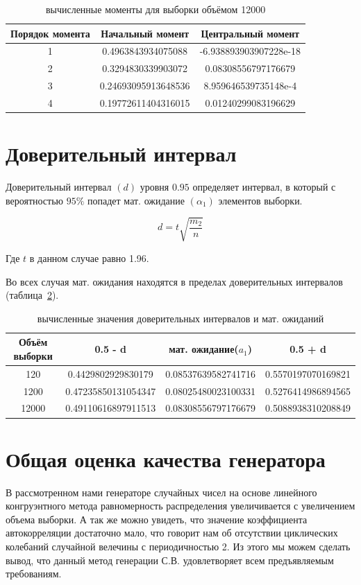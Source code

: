 \documentclass[a4paper,12pt]{article}
\begin{document}
\begin{table}[h]
	\caption{вычисленные моменты для выборки объёмом 12000}
	\begin{tabular}{|c|c|c|}
	\hline 
	Порядок момента & Начальный момент & Центральный момент \\ 
	\hline 
	1 & 0.4963843934075088 & -6.938893903907228e-18 \\ 
	\hline 
	2 & 0.3294830339903072 & 0.08308556797176679 \\ 
	\hline 
	3 & 0.24693095913648536 & 8.959646539735148e-4 \\ 
	\hline 
	4 & 0.19772611404316015 & 0.01240299083196629 \\ 
	\hline 
	\end{tabular} 
	
	\label{table:a_u_3}
\end{table}

\newpage\section{Доверительный интервал}
Доверительный интервал $(d)$ уровня $0.95$ определяет интервал, в который с вероятностью $95\%$ попадет мат. ожидание $(\alpha_1)$ элементов выборки.

{\large $$d=t\sqrt{\frac{m_2}{n}}$$}

Где $t$ в данном случае равно 1.96.

Во всех случая мат. ожидания находятся в пределах доверительных интервалов (таблица~\ref{table:d}).

\begin{table}[h]
	\caption{вычисленные значения доверительных интервалов и мат. ожиданий}
	\begin{tabular}{|c|c|c|c|}
	\hline 
	Объём выборки & 0.5 - d & мат. ожидание($a_1$) & 0.5 + d \\ 
	\hline 
	120 & 0.4429802929830179 & 0.08537639582741716 & 0.5570197070169821 \\ 
	\hline 
	1200 & 0.47235850131054347 & 0.08025480023100331 & 0.5276414986894565 \\ 
	\hline 
	12000 & 0.49110616897911513 & 0.08308556797176679 & 0.5088938310208849 \\ 
	\hline 
	\end{tabular}
	\label{table:d} 
\end{table}

\newpage\section{Общая оценка качества генератора}
В рассмотренном нами генераторе случайных чисел на основе линейного конгруэнтного метода равномерность распределения увеличивается с увеличением объема выборки. А так же можно увидеть, что значение коэффициента автокорреляции достаточно мало, что говорит нам об отсутствии циклических колебаний случайной велечины с периодичностью 2. Из этого мы можем сделать вывод, что данный метод генерации С.В. удовлетворяет всем предъявляемым требованиям. 
\end{document}
